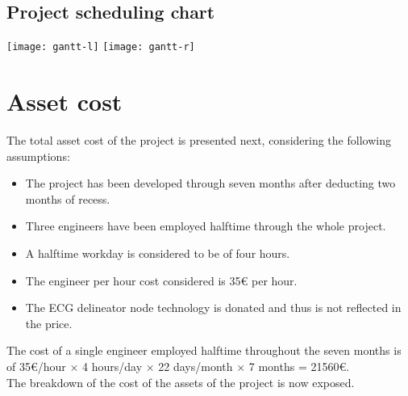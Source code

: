 	\cleartoleftpage
	\subsection{Project scheduling chart}
	    	\texttt{[image: gantt-l]}
	    	\texttt{[image: gantt-r]}

\section{Asset cost}

	The total asset cost of the project is presented next, considering the following assumptions:
	\begin{itemize}
		\item The project has been developed through seven months after deducting two months of recess.
		\item Three engineers have been employed halftime through the whole project.
		\item A halftime workday is considered to be of four hours.
		\item The engineer per hour cost considered is 35{\small \euro} per hour.
		\item The ECG delineator node technology is donated and thus is not reflected in the price.
	\end{itemize}

	The cost of a single engineer employed halftime throughout the seven months is of 35{\small \euro}/hour $\times$ 4 hours/day $\times$ 22 days/month $\times$ 7 months = 21560{\small \euro}.\\

	The breakdown of the cost of the assets of the project is now exposed.\\

